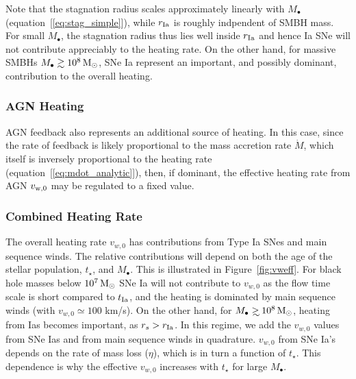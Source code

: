 \documentclass[usenatbib,fleqn]{mn2e}
\newcommand\gsim{\mathrel{\rlap{\lower4pt\hbox{\hskip1pt$\sim$}}
    \raise1pt\hbox{$>$}}}
\newcommand{\rs}{r_s}
\newcommand{\Mbh}[1][]{M_{\bullet#1}}
\newcommand{\rIa}{r_{\rm Ia}}
\newcommand{\vwO}{v_{w,0}}
\newcommand{\tage}{t_{\star}}
\begin{document}
Note that the stagnation radius scales approximately linearly with $M_{\bullet}$ (equation~[\ref{eq:stag_simple}]), while $\rIa$ is roughly indpendent of SMBH mass.  For small $\Mbh$, the stagnation radius thus lies well inside $\rIa$ and hence Ia SNe will not contribute appreciably to the heating rate.  On the other hand, for massive SMBHs $M_{\bullet} \gtrsim 10^8 \,{\rm M_\odot}$, SNe Ia  represent an important, and possibly dominant, contribution to the overall heating.

\subsubsection{AGN Heating}

AGN feedback also represents an additional source of heating.  In this case, since the rate of feedback is likely proportional to the mass accretion rate $\dot{M}$, which itself is inversely proportional to the heating rate (equation~[\ref{eq:mdot_analytic}]), then, if dominant, the effective heating rate from AGN $v_{\rm w,0}$ may be regulated to a fixed value.  

\subsubsection{Combined Heating Rate} The overall heating rate $\vwO$ has contributions from Type Ia SNes and main sequence winds.  The relative contributions will depend on both the age of the stellar population, $\tage$, and $\Mbh$.  This is illustrated in Figure~\ref{fig:vweff}. For black hole masses below $10^7 \,{\rm M_\odot}$ SNe
  Ia will not contribute to $\vwO$ as the flow time scale is short
  compared to $t_{\rm Ia}$, and the heating is dominated by main
  sequence winds (with $\vwO\simeq 100$ km/s).  On the other hand, for
  $\Mbh \gsim 10^8 \Msun$, heating from Ias becomes important, as
  $\rs>\rIa$. In this regime, we add the $\vwO$ values from SNe Ias
  and from main sequence winds in quadrature. $\vwO$ from SNe Ia's
  depends on the rate of mass loss ($\eta$), which is in turn a
  function of $t_{\star}$. This dependence is why the effective
  $\vwO$ increases with $\tage$ for large $\Mbh$.
\end{document}

